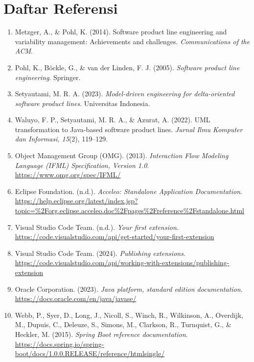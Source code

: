 \documentclass[12pt,a4paper,onecolumn]{article}
\begin{document}
\section*{Daftar Referensi}
\begingroup
\small
\begin{enumerate}
  \item Metzger, A., \& Pohl, K. (2014). Software product line engineering and variability management: Achievements and challenges. \textit{Communications of the ACM}.
  
  \item Pohl, K., Böckle, G., \& van der Linden, F. J. (2005). \textit{Software product line engineering}. Springer.
  
  \item Setyautami, M. R. A. (2023). \textit{Model-driven engineering for delta-oriented software product lines}. Universitas Indonesia.
  
  \item Waluyo, F. P., Setyautami, M. R. A., \& Azurat, A. (2022). UML transformation to Java-based software product lines. \textit{Jurnal Ilmu Komputer dan Informasi, 15}(2), 119--129.
  
  \item Object Management Group (OMG). (2013). \textit{Interaction Flow Modeling Language (IFML) Specification, Version 1.0}. \url{https://www.omg.org/spec/IFML/}
  
  \item Eclipse Foundation. (n.d.). \textit{Acceleo: Standalone Application Documentation}. \url{https://help.eclipse.org/latest/index.jsp?topic=%2Forg.eclipse.acceleo.doc%2Fpages%2Freference%2Fstandalone.html}
  
  \item Visual Studio Code Team. (n.d.). \textit{Your first extension}. \url{https://code.visualstudio.com/api/get-started/your-first-extension}
  
  \item Visual Studio Code Team. (2024). \textit{Publishing extensions}. \url{https://code.visualstudio.com/api/working-with-extensions/publishing-extension}
  
  \item Oracle Corporation. (2023). \textit{Java platform, standard edition documentation}. \url{https://docs.oracle.com/en/java/javase/}
  
  \item Webb, P., Syer, D., Long, J., Nicoll, S., Winch, R., Wilkinson, A., Overdijk, M., Dupuis, C., Deleuze, S., Simons, M., Clarkson, R., Turnquist, G., \& Heckler, M. (2015). \textit{Spring Boot reference documentation}. \url{https://docs.spring.io/spring-boot/docs/1.0.0.RELEASE/reference/htmlsingle/}
  

\end{enumerate}
\end{document}

